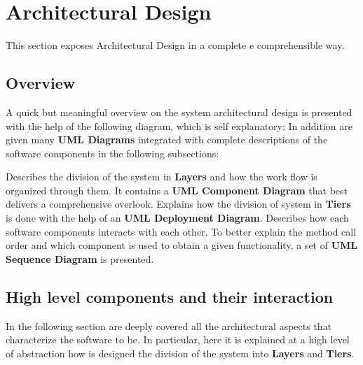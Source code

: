 \section{Architectural Design}
This section exposes \myTaxiService{} Architectural Design in a complete e comprehensible way.

\subsection{Overview}
A quick but meaningful overview on the system architectural design is presented with the help of the following diagram, which is self explanatory:
In addition are given many \textbf{UML Diagrams} integrated with complete descriptions of the software components in the following subsections:
\begin{itemize}
	 Describes the division of the system in \textbf{Layers} and how the work flow is organized through them. It contains a \textbf{UML Component Diagram} that best delivers a comprehensive overlook.
	 Explains how the division of system in \textbf{Tiers} is done with the help of an \textbf{UML Deployment Diagram}.
	 Describes how each software components interacts with each other. To better explain the method call order and which component is used to obtain a given functionality, a set of \textbf{UML Sequence Diagram} is presented.
\end{itemize}

\subsection{High level components and their interaction}
In the following section are deeply covered all the architectural aspects that characterize the software to be.
In particular, here it is explained at a high level of abstraction how is designed the division of the system into \textbf{Layers} and \textbf{Tiers}.

